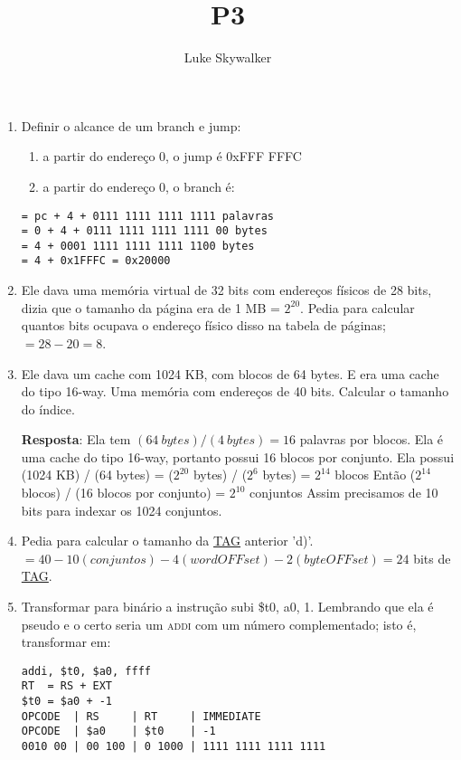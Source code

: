 \documentclass{article}
\author{Luke Skywalker}
\title{P3}
\begin{document}
\maketitle

\begin{enumerate}
\item Definir o alcance de um branch e jump:

\begin{enumerate}
\item a partir do endereço 0, o jump é 0xFFF FFFC
\item a partir do endereço 0, o branch é:
\end{enumerate}

\begin{verbatim}
= pc + 4 + 0111 1111 1111 1111 palavras
= 0 + 4 + 0111 1111 1111 1111 00 bytes
= 4 + 0001 1111 1111 1111 1100 bytes
= 4 + 0x1FFFC = 0x20000
\end{verbatim}

\item Ele dava uma memória virtual de 32 bits com endereços físicos de 28 bits,
dizia que o tamanho da página era de 1 MB = $2^{20}$. Pedia para calcular
quantos bits ocupava o endereço físico disso na tabela de páginas; $= 28 - 20 =
8$.

\item Ele dava um cache com 1024 KB, com blocos de 64 bytes. E era uma cache do
tipo 16-way. Uma memória com endereços de 40 bits. Calcular o tamanho do índice.

\textbf{Resposta}: Ela tem $(64\ bytes) / (4\ bytes ) = 16$ palavras por blocos.
Ela é uma cache do tipo 16-way, portanto possui 16 blocos por conjunto. Ela
possui (1024 KB) / (64 bytes) = ($2^{20}$ bytes) / ($2^{6}$ bytes) = $2^{14}$
blocos Então ($2^{14}$ blocos) / (16 blocos por conjunto) = $2^{10}$ conjuntos
Assim precisamos de 10 bits para indexar os 1024 conjuntos.

\item Pedia para calcular o tamanho da \underline{TAG} anterior 'd)'. $= 40  -
10(conjuntos) - 4(wordOFFset) - 2(byteOFFset) = 24$ bits de \underline{TAG}.

\item Transformar para binário a instrução subi \$t0, a0, 1. Lembrando que ela é
pseudo e o certo seria um \textsc{addi} com um número complementado; isto é,
transformar em:

\begin{verbatim}
addi, $t0, $a0, ffff
RT  = RS + EXT
$t0 = $a0 + -1
OPCODE  | RS     | RT     | IMMEDIATE
OPCODE  | $a0    | $t0    | -1
0010 00 | 00 100 | 0 1000 | 1111 1111 1111 1111
\end{verbatim}


\end{enumerate}
\end{document}
